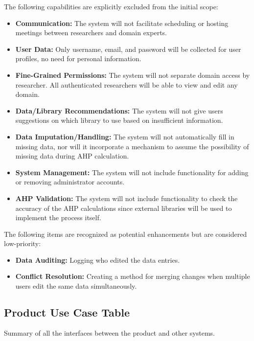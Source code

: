 \documentclass[12pt]{article}
\begin{document}
\noindent The following capabilities are explicitly excluded from the initial scope:

\begin{itemize}
  \item \textbf{Communication:} The system will not facilitate scheduling or hosting meetings between researchers and domain experts.
  \item \textbf{User Data:} Only username, email, and password will be collected for user profiles, no need for personal information.
  \item \textbf{Fine-Grained Permissions:} The system will not separate domain access by researcher. All authenticated researchers will be able to view and edit any domain.
  \item \textbf{Data/Library Recommendations:} The system will not give users suggestions on which library to use based on insufficient information.
  \item \textbf{Data Imputation/Handling:} The system will not automatically fill in missing data, nor will it incorporate a mechanism to assume the possibility of missing data during AHP calculation.
  \item \textbf{System Management:} The system will not include functionality for adding or removing administrator accounts.
  \item \textbf{AHP Validation:} The system will not include functionality to check the accuracy of the AHP calculations since external libraries will be used to implement the process itself.
\end{itemize}

\noindent The following items are recognized as potential enhancements but are considered low-priority:

\begin{itemize}
  \item \textbf{Data Auditing:} Logging who edited the data entries.
  \item \textbf{Conflict Resolution:} Creating a method for merging changes when multiple users edit the same data simultaneously.
\end{itemize}

\subsection{Product Use Case Table}
Summary of all the interfaces between the product and other systems.\\
\end{document}
